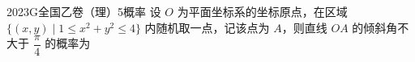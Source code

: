 
\begin{problem}{2023}{G}{全国乙卷（理）}{5}{概率}
设 $ O $ 为平面坐标系的坐标原点，在区域 $ \{(x, y) \mid 1 \leqslant x^2 + y^2 \leqslant 4\} $ 内随机取一点，记该点为 $ A $，则直线 $ OA $ 的倾斜角不大于 $ \dfrac{\pi}{4} $ 的概率为
\begin{choices}
\end{choices}
\end{problem}

\begin{answer}

\end{answer}

\begin{solutions}

\end{solutions}